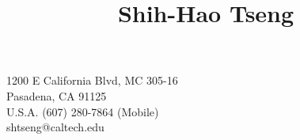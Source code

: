 \title{Shih-Hao Tseng}{
1200 E California Blvd, MC 305-16\\
Pasadena, CA 91125\\
U.S.A.
}{
(607) 280-7864 (Mobile) \\
shtseng@caltech.edu
}